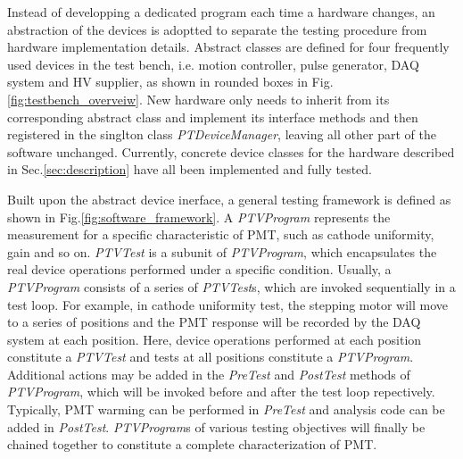 \documentclass[5p, times]{elsarticle}
\begin{document}
Instead of developping a dedicated program each time a hardware changes, an abstraction of the devices is adoptted to separate the testing procedure from hardware implementation details. 
Abstract classes are defined for four frequently used devices in the test bench, i.e. motion controller, pulse generator, DAQ system and HV supplier, as shown in rounded boxes in Fig.\ref{fig:testbench_overveiw}.
New hardware only needs to inherit from its corresponding abstract class and implement its interface methods and then registered in the singlton class \textit{PTDeviceManager}, leaving all other part of the software unchanged.
Currently, concrete device classes for the hardware described in Sec.\ref{sec:description} have all been implemented and fully tested.

Built upon the abstract device inerface, a general testing framework is defined as shown in Fig.\ref{fig:software_framework}.
A \textit{PTVProgram} represents the measurement for a specific characteristic of PMT, such as cathode uniformity, gain and so on.
\textit{PTVTest} is a subunit of \textit{PTVProgram}, which encapsulates the real device operations performed under a specific condition.
Usually, a \textit{PTVProgram} consists of a series of \textit{PTVTest}s, which are invoked sequentially in a test loop.
For example, in cathode uniformity test, the stepping motor will move to a series of positions and the PMT response will be recorded by the DAQ system at each position.
Here, device operations performed at each position constitute a \textit{PTVTest} and tests at all positions constitute a \textit{PTVProgram}.
Additional actions may be added in the \textit{PreTest} and \textit{PostTest} methods of \textit{PTVProgram}, which will be invoked before and after the test loop repectively.
Typically, PMT warming can be performed in \textit{PreTest} and analysis code can be added in \textit{PostTest}.
\textit{PTVProgram}s of various testing objectives will finally be chained together to constitute a complete characterization of PMT.
\end{document}
